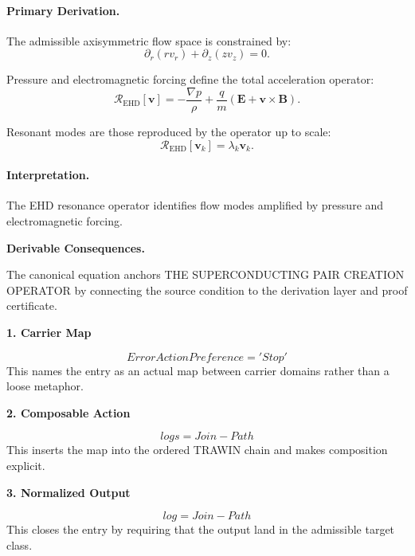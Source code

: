 \paragraph{Primary Derivation.}
The admissible axisymmetric flow space is constrained by:
\begin{equation}
\partial_r(rv_r)+\partial_z(zv_z)=0.
\end{equation}

Pressure and electromagnetic forcing define the total acceleration operator:
\begin{equation}
\mathcal{R}_{\mathrm{EHD}}[\mathbf{v}]
=
-\frac{\nabla p}{\rho}
+
\frac{q}{m}
(\mathbf{E}+\mathbf{v}\times\mathbf{B}).
\end{equation}

Resonant modes are those reproduced by the operator up to scale:
\begin{equation}
\boxed{
\mathcal{R}_{\mathrm{EHD}}[\mathbf{v}_k]
=
\lambda_k\mathbf{v}_k.
}
\end{equation}

\paragraph{Interpretation.}
The EHD resonance operator identifies flow modes amplified by pressure and electromagnetic forcing.

\par\vspace{0.35em}
\noindent\textbf{Derivable Consequences.}\quad
\begingroup
\footnotesize
\raggedright
The canonical equation anchors THE SUPERCONDUCTING PAIR CREATION OPERATOR by connecting the source condition to the derivation layer and proof certificate.
\par\endgroup

\noindent\textbf{1. Carrier Map}\par
\[
ErrorActionPreference='Stop'
\]
\noindent This names the entry as an actual map between carrier domains rather than a loose metaphor.\par
\noindent\textbf{2. Composable Action}\par
\[
logs=Join-Path
\]
\noindent This inserts the map into the ordered TRAWIN chain and makes composition explicit.\par
\noindent\textbf{3. Normalized Output}\par
\[
log=Join-Path
\]
\noindent This closes the entry by requiring that the output land in the admissible target class.\par

